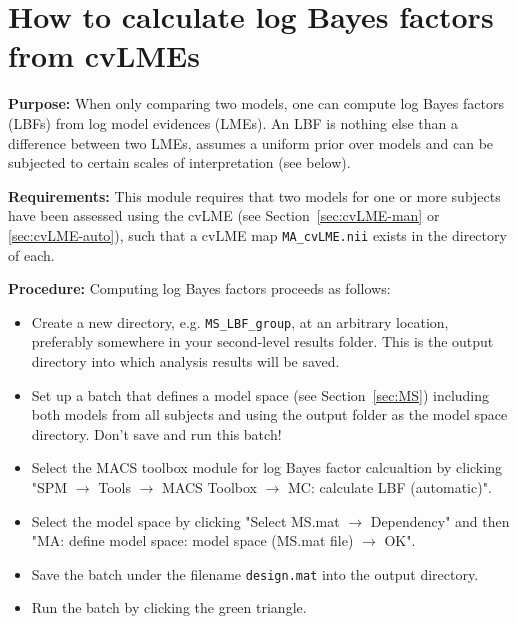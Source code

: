 \documentclass[a4paper,12pt]{article}
\newcommand{\ra}{$\rightarrow$ }
\begin{document}
\pagebreak
{}
\section{How to calculate log Bayes factors from cvLMEs} \label{sec:LBF}

\textbf{Purpose:} When only comparing two models, one can compute log Bayes factors (LBFs) from log model evidences (LMEs). An LBF is nothing else than a difference between two LMEs, assumes a uniform prior over models and can be subjected to certain scales of interpretation (see below).

\textbf{Requirements:} This module requires that two models for one or more subjects have been assessed using the cvLME (see Section~\ref{sec:cvLME-man} or \ref{sec:cvLME-auto}), such that a cvLME map \texttt{MA\_cvLME.nii} exists in the directory of each.

\textbf{Procedure:} Computing log Bayes factors proceeds as follows:
\begin{itemize}

\item
Create a new directory, e.g. \texttt{MS\_LBF\_group}, at an arbitrary location, preferably somewhere in your second-level results folder. This is the output directory into which analysis results will be saved.

\item
Set up a batch that defines a model space (see Section~\ref{sec:MS}) including both models from all subjects and using the output folder as the model space directory. Don't save and run this batch!

\item
Select the MACS toolbox module for log Bayes factor calcualtion by clicking \linebreak[4] "SPM \ra Tools \ra MACS Toolbox \ra MC: calculate LBF (automatic)".

\item
Select the model space by clicking "Select MS.mat \ra Dependency" and then \linebreak[4] "MA: define model space: model space (MS.mat file) \ra OK".

\item
Save the batch under the filename \texttt{design.mat} into the output directory.

\item
Run the batch by clicking the green triangle.

\end{itemize}
\end{document}
